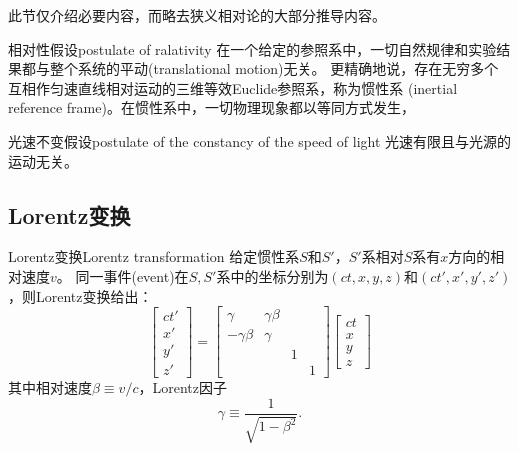 此节仅介绍必要内容，而略去狭义相对论的大部分推导内容。%

\begin{theorem}
    {相对性假设}{postulate of ralativity}
    在一个给定的参照系中，一切自然规律和实验结果都与整个系统的平动(translational motion)无关。
    更精确地说，存在无穷多个互相作匀速直线相对运动的三维等效Euclide参照系，称为惯性系
    (inertial reference frame)。在惯性系中，一切物理现象都以等同方式发生，
\end{theorem}

\begin{theorem}
    {光速不变假设}{postulate of the constancy of the speed of light}
    光速有限且与光源的运动无关。
\end{theorem}

\subsection{Lorentz变换}

\begin{theorem}
    {Lorentz变换}{Lorentz transformation}
    给定惯性系$S$和$S'$，$S'$系相对$S$系有$x$方向的相对速度$v$。
    同一事件(event)在$S,S'$系中的坐标分别为$(ct,x,y,z)$和$(ct',x',y',z')$，则Lorentz变换给出：
    \begin{equation}
    	\begin{bmatrix}
    		ct'\\x'\\y'\\z'
    	\end{bmatrix}=
    	\begin{bmatrix}
    		\gamma&\gamma\beta\\-\gamma\beta&\gamma\\ &&1\\ &&&1
    	\end{bmatrix}
    	\begin{bmatrix}
    		ct\\x\\y\\z
    	\end{bmatrix}
    \end{equation}
    其中相对速度$\beta\equiv v/c$，Lorentz因子
    \[
        \gamma\equiv\frac1{\sqrt{1-\beta^2}}.
    \]
\end{theorem}

